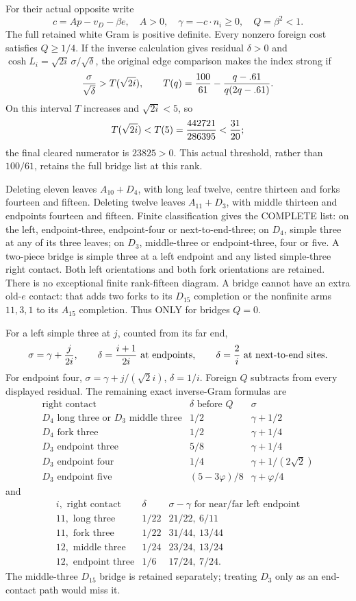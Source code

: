 For their actual opposite write
\[
 c=Ap-v_D-\beta e,\quad A>0,\quad
 \gamma=-c\cdot n_i\ge0,\quad Q=\beta^2<1.
\]
The full retained white Gram is positive definite.
Every nonzero foreign cost satisfies \(Q\ge1/4\).
If the inverse calculation gives residual \(\delta>0\) and
\(\cosh L_i=\sqrt{2i}\,\sigma/\sqrt\delta\),
the original edge comparison makes the index strong if
\[
 {\sigma\over\sqrt\delta}>T(\sqrt{2i}),\qquad
 T(q)={100\over61}-{q-.61\over q(2q-.61)}.
\]
On this interval \(T\) increases and \(\sqrt{2i}<5\), so
\[
 T(\sqrt{2i})<T(5)={442721\over286395}<{31\over20};
\]
the final cleared numerator is \(23825>0\).
This actual threshold, rather than \(100/61\), retains
the full bridge list at this rank.

Deleting eleven leaves \(A_{10}+D_4\), with long leaf twelve,
centre thirteen and forks fourteen and fifteen.
Deleting twelve leaves \(A_{11}+D_3\), with middle thirteen
and endpoints fourteen and fifteen.
Finite classification gives the COMPLETE list:
on the left, endpoint-three, endpoint-four or next-to-end-three;
on \(D_4\), simple three at any of its three leaves;
on \(D_3\), middle-three or endpoint-three, four or five.
A two-piece bridge is simple three at a left endpoint and
any listed simple-three right contact.
Both left orientations and both fork orientations are retained.
There is no exceptional finite rank-fifteen diagram.
A bridge cannot have an extra old-\(e\) contact:
that adds two forks to its \(D_{15}\) completion or the
nonfinite arms \(11,3,1\) to its \(A_{15}\) completion.
Thus ONLY for bridges \(Q=0\).

For a left simple three at \(j\), counted from its far end,
\[
 \sigma=\gamma+{j\over2i},\qquad
 \delta={i+1\over2i}\text{ at endpoints},\qquad
 \delta={2\over i}\text{ at next-to-end sites}.
\]
For endpoint four,
\(\sigma=\gamma+j/(\sqrt2i)\), \(\delta=1/i\).
Foreign \(Q\) subtracts from every displayed residual.
The remaining exact inverse-Gram formulas are
\[
\begin{array}{c|c|c}
 \text{right contact}&\delta\text{ before }Q&\sigma\\ \hline
 D_4\text{ long three or }D_3\text{ middle three}
       &1/2&\gamma+1/2\\
 D_4\text{ fork three}&1/2&\gamma+1/4\\
 D_3\text{ endpoint three}&5/8&\gamma+1/4\\
 D_3\text{ endpoint four}&1/4&\gamma+1/(2\sqrt2)\\
 D_3\text{ endpoint five}&(5-3\varphi)/8&\gamma+\varphi/4
\end{array}
\]
and
\[
\begin{array}{c|c|c}
 i,\text{ right contact}&\delta&
       \sigma-\gamma\text{ for near/far left endpoint}\\ \hline
11,\text{ long three}&1/22&21/22,\ 6/11\\
11,\text{ fork three}&1/22&31/44,\ 13/44\\
12,\text{ middle three}&1/24&23/24,\ 13/24\\
12,\text{ endpoint three}&1/6&17/24,\ 7/24 .
\end{array}
\]
The middle-three \(D_{15}\) bridge is retained separately;
treating \(D_3\) only as an end-contact path would miss it.

